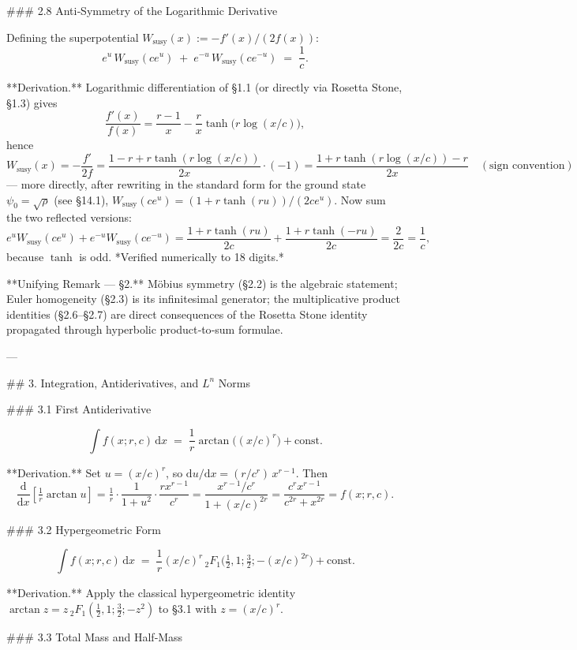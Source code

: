 ### 2.8 Anti‑Symmetry of the Logarithmic Derivative

Defining the superpotential $W_{\text{susy}}(x) := -f'(x)/(2f(x))$:
$$
e^{u}\,W_{\text{susy}}(ce^{u}) \;+\; e^{-u}\,W_{\text{susy}}(ce^{-u}) \;=\; \frac{1}{c}.
$$

**Derivation.** Logarithmic differentiation of §1.1 (or directly via Rosetta Stone, §1.3) gives
$$
\frac{f'(x)}{f(x)} = \frac{r-1}{x} - \frac{r}{x}\tanh\!\bigl(r\log(x/c)\bigr),
$$
hence
$$
W_{\text{susy}}(x) = -\frac{f'}{2f} = \frac{1-r+r\tanh(r\log(x/c))}{2x}\cdot(-1) = \frac{1+r\tanh(r\log(x/c)) - r}{2x}\quad(\text{sign convention})
$$
— more directly, after rewriting in the standard form for the ground state $\psi_{0}=\sqrt{\rho}$ (see §14.1), $W_{\text{susy}}(ce^{u}) = (1+r\tanh(ru))/(2ce^{u})$. Now sum the two reflected versions:
$$
e^{u}W_{\text{susy}}(ce^{u}) + e^{-u}W_{\text{susy}}(ce^{-u}) = \frac{1+r\tanh(ru)}{2c} + \frac{1+r\tanh(-ru)}{2c} = \frac{2}{2c} = \frac{1}{c},
$$
because $\tanh$ is odd. *Verified numerically to 18 digits.*

**Unifying Remark — §2.** Möbius symmetry (§2.2) is the algebraic statement; Euler homogeneity (§2.3) is its infinitesimal generator; the multiplicative product identities (§2.6–§2.7) are direct consequences of the Rosetta Stone identity propagated through hyperbolic product‑to‑sum formulae.

---

## 3. Integration, Antiderivatives, and $L^{n}$ Norms

### 3.1 First Antiderivative

$$
\int f(x;r,c)\,\mathrm dx \;=\; \frac{1}{r}\arctan\!\bigl((x/c)^{r}\bigr) + \text{const}.
$$

**Derivation.** Set $u=(x/c)^{r}$, so $\mathrm du/\mathrm dx = (r/c^{r})\,x^{r-1}$. Then
$$
\frac{\mathrm d}{\mathrm dx}\!\left[\tfrac{1}{r}\arctan u\right] = \tfrac{1}{r}\cdot\frac{1}{1+u^{2}}\cdot\frac{r x^{r-1}}{c^{r}} = \frac{x^{r-1}/c^{r}}{1+(x/c)^{2r}} = \frac{c^{r}x^{r-1}}{c^{2r}+x^{2r}} = f(x;r,c).
$$

### 3.2 Hypergeometric Form

$$
\int f(x;r,c)\,\mathrm dx \;=\; \frac{1}{r}(x/c)^{r}\,{}_{2}F_{1}\!\bigl(\tfrac{1}{2},1;\tfrac{3}{2};-(x/c)^{2r}\bigr) + \text{const}.
$$

**Derivation.** Apply the classical hypergeometric identity $\arctan z = z\,{}_{2}F_{1}(\tfrac{1}{2},1;\tfrac{3}{2};-z^{2})$ to §3.1 with $z=(x/c)^{r}$.

### 3.3 Total Mass and Half‑Mass

